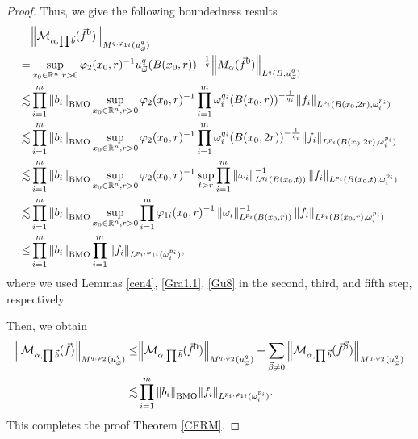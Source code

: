 \documentclass[11pt, twoside, leqno]{article}
\begin{document}
\begin{proof}[Proof]
	Thus, we give the following boundedness results
	\begin{align}\label{ieq4}
	&{\left\| {{\mathcal{M}_{\alpha ,\prod {\vec b} }}({{\vec f}^{0}})} \right\|_{{M^{q,{\varphi _{1i}}}}(u_{\vec \omega }^q)}}\notag\\
	=&\mathop {\sup }\limits_{{x_0} \in {\mathbb R^n},r > 0} {\varphi _2}{({x_0},r)^{ - 1}}u_{\vec \omega }^q{(B({x_0},r))^{ - \frac{1}{q}}}{\left\| {{M_\alpha }({{\vec f}^0})} \right\|_{{L^q}(B,u_{\vec \omega }^q)}}\notag\\
	\lesssim&\prod\limits_{i = 1}^m {{{\left\| {{b_i}} \right\|}_{\rm BMO}}}\mathop {\sup }\limits_{{x_0} \in {\mathbb R^n},r > 0} {\varphi _2}{({x_0},r)^{ - 1}}\prod\limits_{i = 1}^m {\omega _i^{{q_i}}{{(B({x_0},r))}^{ - \frac{1}{{{q_i}}}}}{{\left\| {{f_i}} \right\|}_{{L^{{p_i}}}(B({x_0},2r),\omega _i^{{p_i}})}}}\notag\\
	\lesssim&\prod\limits_{i = 1}^m {{{\left\| {{b_i}} \right\|}_{\rm BMO}}}\mathop {\sup }\limits_{{x_0} \in {\mathbb R^n},r > 0} {\varphi _2}{({x_0},r)^{ - 1}}\prod\limits_{i = 1}^m {\omega _i^{{q_i}}{{(B({x_0},2r))}^{ - \frac{1}{{{q_i}}}}}{{\left\| {{f_i}} \right\|}_{{L^{{p_i}}}(B({x_0},2r),\omega _i^{{p_i}})}}}\notag\\
	\lesssim&\prod\limits_{i = 1}^m {{{\left\| {{b_i}} \right\|}_{\rm BMO}}}\mathop {\sup }\limits_{{x_0} \in {{\mathbb R^n}},r > 0} {\varphi _2}{({x_0},r)^{ - 1}}\mathop {\sup }\limits_{t > r} \prod\limits_{i = 1}^m {\left\| {{\omega _i}} \right\|_{{L^{{q_i}}}(B({x_0},t))}^{ - 1}{{\left\| {{f_i}} \right\|}_{{L^{{p_i}}}(B({x_0},t),\omega _i^{{p_i}})}}}\notag\\
	\lesssim&\prod\limits_{i = 1}^m {{{\left\| {{b_i}} \right\|}_{\rm BMO}}}\mathop {\sup }\limits_{{x_0} \in {\mathbb R^n},r > 0} \prod\limits_{i = 1}^m {{\varphi _{1i}}{{({x_0},r)}^{ - 1}}\left\| {{\omega _i}} \right\|_{{L^{{p_i}}}(B({x_0},r))}^{ - 1}{{\left\| {{f_i}} \right\|}_{{L^{{p_i}}}(B({x_0},r),\omega _i^{{p_i}})}}}\notag\\
	\le&\prod\limits_{i = 1}^m {{{\left\| {{b_i}} \right\|}_{\rm BMO}}}\prod\limits_{i = 1}^m {{{\left\| {{f_i}} \right\|}_{{L^{{p_i},{\varphi _{1i}}}}(\omega _i^{{p_i}})}}},
	\end{align}
	where we used Lemmas \ref{cen4}, \ref{Gra1.1}, \ref{Gu8} in the second, third, and fifth step, respectively.
	
	Then, we obtain
	\begin{align*}
	{\left\| {{\mathcal{M}_{\alpha ,\prod {\vec b} }}(\vec f)} \right\|_{{M^{q,{\varphi _2}}}(u_{\vec \omega }^q)}} \le& {\left\| {{\mathcal{M}_{\alpha ,\prod {\vec b} }}({{\vec f}^0})} \right\|_{{M^{q,{\varphi _2}}}(u_{\vec \omega }^q)}} + \sum\limits_{\vec \beta  \ne 0} {{{\left\| {{\mathcal{M}_{\alpha ,\prod {\vec b} }}({{\vec f}^{\vec \beta }})} \right\|}_{{M^{q,{\varphi _2}}}(u_{\vec \omega }^q)}}}\notag\\ 
	\lesssim& \prod\limits_{i = 1}^m {{{\left\| {{b_i}} \right\|}_{\rm BMO}}{{\left\| {{f_i}} \right\|}_{{L^{{p_i},{\varphi _{1i}}}}(\omega _i^{{p_i}})}}}.
	\end{align*}
	This completes the proof Theorem \ref{CFRM}.
\end{proof}
\end{document}
